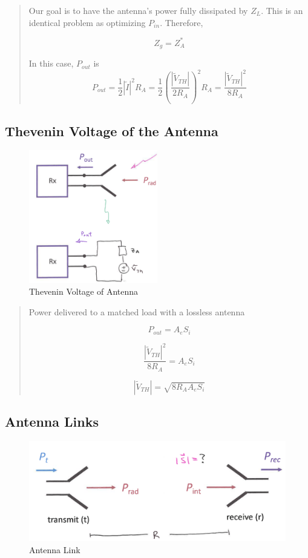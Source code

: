 \documentclass{article} %
\begin{document}
\begin{quote}
    Our goal is to have the antenna's power fully dissipated by $Z_L$.
    This is an identical problem as optimizing $P_{in}$. Therefore,

    \[Z_g = Z_A^*\]

    In this case, $P_{out}$ is
    \[P_{out} = \frac{1}{2}|\tilde{I}|^2 R_A = \frac{1}{2}\left(\frac{|\tilde{V}_{TH}|}{2R_A}\right)^2R_A = \frac{|\tilde{V}_{TH}|^2}{8R_A}\]
\end{quote}

\subsection{Thevenin Voltage of the Antenna}
\begin{figure}[H]
    \centering
    \includegraphics[width=0.5\textwidth]{./image/figure7.png}
    \caption{Thevenin Voltage of Antenna}
\end{figure}
\begin{quote}
    Power delivered to a matched load with a lossless antenna

    \[P_{out} = A_e S_i\]

    \[\frac{|\tilde{V}_{TH}|^2}{8R_A} = A_e S_i\]

    \[|\tilde{V}_{TH}| = \sqrt{8 R_A A_e S_i}\]
\end{quote}

\subsection{Antenna Links}

\begin{figure}[H]
    \centering
    \includegraphics[width=1\textwidth]{./image/figure8.png}
    \caption{Antenna Link}
\end{figure}
\end{document}
